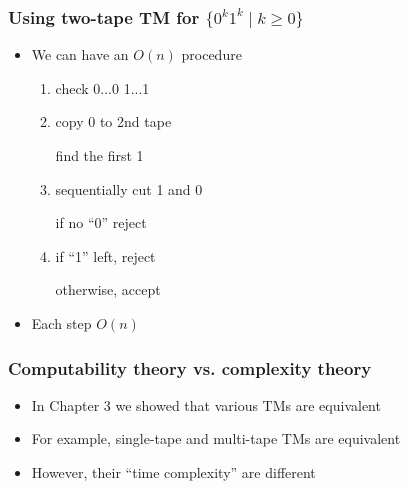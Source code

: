 \begin{frame}[allowframebreaks]
\begin{itemize}
\end{itemize}\end{frame} \begin{frame}[allowframebreaks] \frametitle{Using two-tape TM for $ \{0^k1^k \mid k \geq 0\}$}
  \begin{itemize}
\item We can have an $O(n)$ procedure
  \begin{enumerate}
  \item check 0...0 1...1

  \item copy 0 to 2nd tape

find the first 1
\item sequentially cut 1 and 0

if no ``0'' reject
\item if ``1'' left, reject

otherwise, accept
  \end{enumerate}

\item Each step $O(n)$

\end{itemize}\end{frame} \begin{frame}[allowframebreaks] \frametitle{Computability theory vs. complexity theory}
    \begin{itemize}
\item In Chapter 3 we showed that various TMs are equivalent
\item For example, single-tape and multi-tape TMs are equivalent
\item However, their ``time complexity'' are different
\end{itemize}\end{frame}

